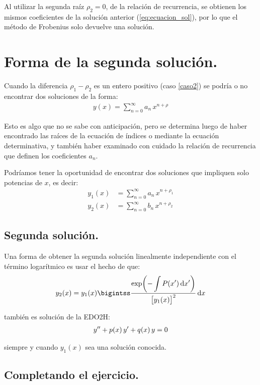 Al utilizar la segunda raíz $\rho_{2} = 0$, de la relación de recurrencia, se obtienen los mismos coeficientes de la solución anterior (\ref{eq:ecuacion_sol}), por lo que el método de Frobenius solo devuelve una solución.

\section{Forma de la segunda solución.}

Cuando la diferencia $\rho_{1} - \rho_{2}$ es un entero positivo (caso \ref{caso2}) se podría o no encontrar dos soluciones de la forma:
\begin{align*}
y(x) = \sum_{n=0}^{\infty} a_{n} \, x^{n+\rho}
\end{align*}

Esto es algo que no se sabe con anticipación, pero se determina luego de haber encontrado las raíces de la ecuación de índices o mediante la ecuación determinativa, y también haber examinado con cuidado la relación de recurrencia que definen los coeficientes $a_{n}$.
\par
Podríamos tener la oportunidad de encontrar dos soluciones que impliquen solo potencias de $x$, es decir:
\begin{align*}
y_{1} (x) &= \sum_{n=0}^{\infty} a_{n} \, x^{n+\rho_{1}} \\[1em]
y_{2} (x) &= \sum_{n=0}^{\infty} b_{n} \, x^{n+\rho_{2}}
\end{align*}

\subsection{Segunda solución.}

Una forma de obtener la segunda solución linealmente independiente con el término logarítmico es usar el hecho de que:
\begin{align}
y_{2} (x) = y_{1}(x) \bigintss \dfrac{\exp(\displaystyle -\int P(x') \dd{x'})}{\big[ y_{1}(x) \big]^{2}} \dd{x}
\label{eq:ecuacion_23_Zill}
\end{align}

también es solución de la EDO2H:
\begin{align*}
{y}^{\prime \prime} + p(x) \, {y}^{\prime} + q(x) \, y = 0
\end{align*}

siempre y cuando $y_{1}(x)$ sea una solución conocida.

\subsection{Completando el ejercicio.}

